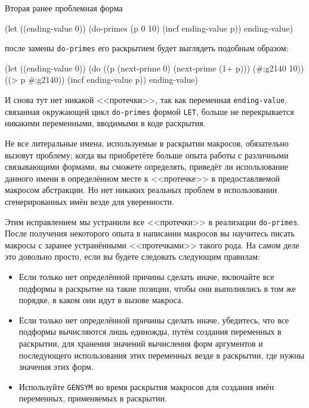 Вторая ранее проблемная форма

\begin{myverb}
(let ((ending-value 0))
  (do-primes (p 0 10)
    (incf ending-value p))
  ending-value)
\end{myverb}

\noindent{}после замены \lstinline{do-primes} его раскрытием будет выглядеть подобным образом:

\begin{myverb}
(let ((ending-value 0))
  (do ((p (next-prime 0) (next-prime (1+ p)))
       (#:g2140 10))
      ((> p #:g2140))
    (incf ending-value p))
  ending-value)
\end{myverb}

И снова тут нет никакой <<протечки>>, так как переменная \lstinline{ending-value}, связанная
окружающей цикл \lstinline{do-primes} формой \lstinline{LET}, больше не перекрывается никакими
переменными, вводимыми в коде раскрытия.

Не все литеральные имена, используемые в раскрытии макросов, обязательно вызовут проблему;
когда вы приобретёте больше опыта работы с различными свя\-зы\-ваю\-щи\-ми формами, вы сможете
определять, приведёт ли использование данного имени в определённом месте к <<протечке>> в
предоставляемой макросом абстракции. Но нет никаких реальных проблем в использовании
сгенерированных имён везде для уверенности.

Этим исправлением мы устранили все <<протечки>> в реализации \lstinline{do-primes}. После
получения некоторого опыта в написании макросов вы научитесь писать макросы с заранее
устранёнными <<протечками>> такого рода. На самом деле это довольно просто, если вы будете
следовать следующим правилам:
\begin{itemize}
\item Если только нет определённой причины сделать иначе, включайте все подформы в
  раскрытие на такие позиции, чтобы они выполнялись в том же порядке, в каком они идут в
  вызове макроса.
\item Если только нет определённой причины сделать иначе, убедитесь, что все подформы
  вычисляются лишь единожды, путём создания переменных в раскрытии, для хранения значений
  вычисления форм аргументов и последующего использования этих переменных везде в
  раскрытии, где нужны значения этих форм.
\item Используйте \lstinline{GENSYM} во время раскрытия макросов для создания имён
  переменных, применяемых в раскрытии.
\end{itemize}

